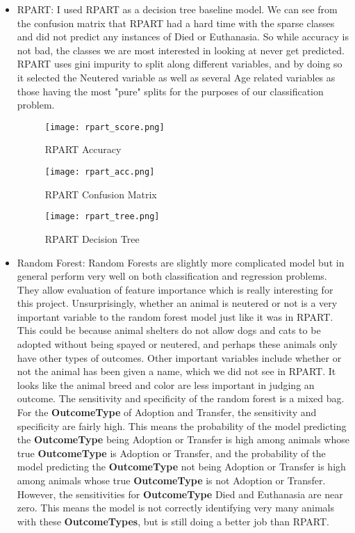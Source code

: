 \documentclass[12pt]{article} %
\begin{document}
\begin{itemize}

\item RPART: I used RPART as a decision tree baseline model. We can see from the confusion matrix that RPART had a hard time with the sparse classes and did not predict any instances of Died or Euthanasia. So while accuracy is not bad, the classes we are most interested in looking at never get predicted. RPART uses gini impurity to split along different variables, and by doing so it selected the Neutered variable as well as several Age related variables as those having the most "pure" splits for the purposes of our classification problem.

\begin{figure}[bp!]
  \centering
  \texttt{[image: rpart\_score.png]}                  
  \caption{RPART Accuracy}
  \label{fig:RF Model}
\end{figure}

\begin{figure}[bp!]
  \centering
  \texttt{[image: rpart\_acc.png]}                  
  \caption{RPART Confusion Matrix}
  \label{fig:RF Model}
\end{figure}

\begin{figure}[h!]
  \centering
  \texttt{[image: rpart\_tree.png]}                  
  \caption{RPART Decision Tree}
  \label{fig:RF Model}
\end{figure}

\newpage

\item Random Forest: Random Forests are slightly more complicated model but in general perform very well on both classification and regression problems. They allow evaluation of feature importance which is really interesting for this project. Unsurprisingly, whether an animal is neutered or not is a very important variable to the random forest model just like it was in RPART. This could be because animal shelters do not allow dogs and cats to be adopted without being spayed or neutered, and perhaps these animals only have other types of outcomes. Other important variables include whether or not the animal has been given a name, which we did not see in RPART. It looks like the animal breed and color are less important in judging an outcome. The sensitivity and specificity of the random forest is a mixed bag. For the \textbf{OutcomeType} of Adoption and Transfer, the sensitivity and specificity are fairly high. This means the probability of the model predicting the \textbf{OutcomeType} being Adoption or Transfer is high among animals whose true \textbf{OutcomeType} is Adoption or Transfer, and the probability of the model predicting the \textbf{OutcomeType} not being Adoption or Transfer is high among animals whose true \textbf{OutcomeType} is not Adoption or Transfer. However, the sensitivities for \textbf{OutcomeType} Died and Euthanasia are near zero. This means the model is not correctly identifying very many animals with these \textbf{OutcomeTypes}, but is still doing a better job than RPART. 



\end{itemize}
\end{document}
